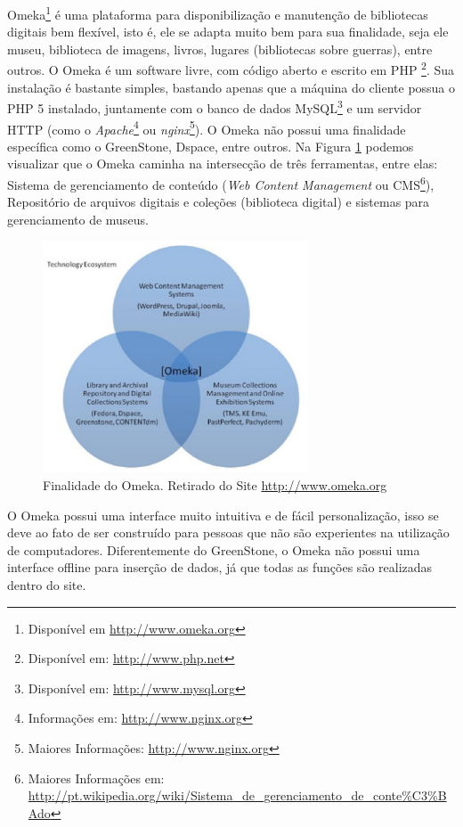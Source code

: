 Omeka\footnote{Disponível em \url{http://www.omeka.org}} é uma plataforma para disponibilização e manutenção de  bibliotecas digitais bem flexível, isto é, ele se adapta muito bem para sua finalidade, seja ele museu, biblioteca de imagens, livros, lugares (bibliotecas sobre guerras), entre outros. O Omeka é um software livre, com código aberto e escrito em PHP \footnote{Disponível em: \url{http://www.php.net}}. Sua instalação é bastante simples, bastando apenas que a máquina do cliente possua o PHP 5 instalado, juntamente com o banco de dados MySQL\footnote{Disponível em: \url{http://www.mysql.org}} e um servidor HTTP (como o \textit{Apache}\footnote{Informações em: \url{http://www.nginx.org}} ou \textit{nginx}\footnote{Maiores Informações: \url{http://www.nginx.org}}). O Omeka não possui uma finalidade específica como o GreenStone, Dspace, entre outros. Na Figura \ref{fig:finalidadeomeka} podemos visualizar que o Omeka caminha na intersecção de três ferramentas, entre elas: Sistema de gerenciamento de conteúdo (\textit{Web Content Management} ou CMS\footnote{Maiores Informações em: \url{http://pt.wikipedia.org/wiki/Sistema_de_gerenciamento_de_conte\%C3\%BAdo}}), Repositório de arquivos digitais e coleções (biblioteca digital) e sistemas para gerenciamento de museus.

\graphicspath{{figuras/}}
\begin{figure}[H]
\centering
\includegraphics[width=0.7\textwidth]{finalidade_omeka}
\caption[Finalidade do Omeka]{Finalidade do Omeka. Retirado do Site \url{http://www.omeka.org}}
\label{fig:finalidadeomeka}
\end{figure}

O Omeka possui uma interface muito intuitiva e de fácil personalização, isso se deve ao fato de ser construído para pessoas que não são experientes na utilização de computadores. Diferentemente do GreenStone, o Omeka não possui uma interface offline para inserção de dados, já que todas as funções são realizadas dentro do site.


